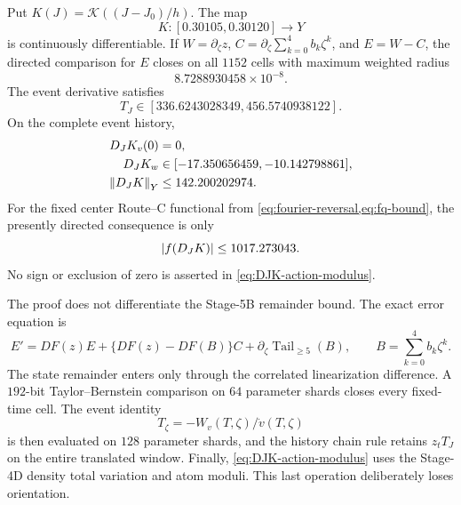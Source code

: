 \begin{theorem}
\label{thm:event-first-derivative}
Put \(K(J)=\mathcal K((J-J_0)/h)\).  The map
\[
 K:[0.30105,0.30120]\longrightarrow Y
\]
is continuously differentiable.  If \(W=\partial_\zeta z\),
\(C=\partial_\zeta\sum_{k=0}^4b_k\zeta^k\), and \(E=W-C\), the directed
comparison for \(E\) closes on all \(1152\) cells with maximum weighted
radius
\begin{equation}
 8.7288930458\times10^{-8}.                            \label{eq:stage5d-radius}
\end{equation}
The event derivative satisfies
\begin{equation}
 T_J\in[336.6243028349,456.5740938122].                \label{eq:TJ-bound}
\end{equation}
On the complete event history,
\begin{align}
 D_JK_v(0)&=0,\notag\\
 D_JK_w&\in[-17.350656459,-10.142798861],\notag\\
 \left\lVert D_JK\right\rVert_Y&\le142.200202974.                       \label{eq:DJK-bound}
\end{align}
For the fixed center Route--C functional from
\cref{eq:fourier-reversal,eq:fq-bound}, the presently directed consequence
is only
\begin{equation}
 \left\lvert f(D_JK)\right\rvert\le1017.273043.                          \label{eq:DJK-action-modulus}
\end{equation}
No sign or exclusion of zero is asserted in
\cref{eq:DJK-action-modulus}.
\end{theorem}

The proof does not differentiate the Stage-5B remainder bound.  The exact
error equation is
\[
 E'=DF(z)E+\{DF(z)-DF(B)\}C
       +\partial_\zeta\operatorname{Tail}_{\ge5}(B),
 \qquad B=\sum_{k=0}^4b_k\zeta^k.
\]
The state remainder enters only through the correlated linearization
difference.  A \(192\)-bit Taylor--Bernstein comparison on \(64\) parameter
shards closes every fixed-time cell.  The event identity
\[
 T_\zeta=-W_v(T,\zeta)/\dot v(T,\zeta)
\]
is then evaluated on \(128\) parameter shards, and the history chain rule
retains \(z_tT_J\) on the entire translated window.  Finally,
\cref{eq:DJK-action-modulus} uses the Stage-4D density total variation and
atom moduli.  This last operation deliberately loses orientation.

